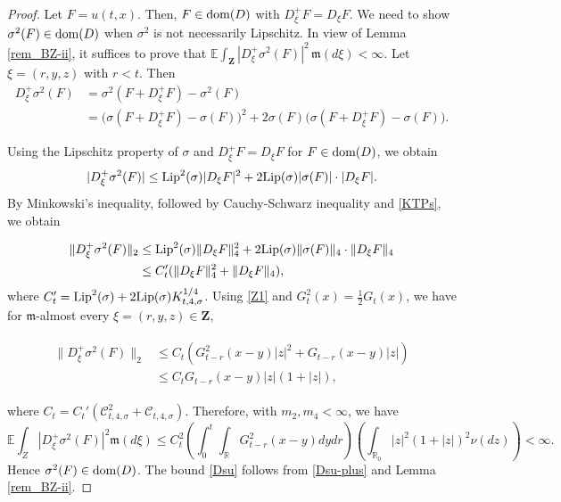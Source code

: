 \documentclass[letterpaper, 11pt,  reqno]{amsart}
\newcommand{\noi}{\noindent}
\newcommand{\R}{\mathbb{R}}
\newcommand{\E}{\mathbb{E}}
\newcommand{\s}{\sigma}
\newcommand{\fm}{\mathfrak{m}}
\newcommand{\dom}{\textup{dom}}
\numberwithin{equation}{section}
\numberwithin{theorem}{section}
\begin{document}
\begin{proof}
Let $F=u(t,x)$. Then, $F\in\dom(D)$ with $D^+_\xi F = D_\xi F$.
 We need to show $\s^2(F) \in  \dom(D)$ when $\s^2$ is not necessarily Lipschitz. 
In view of  Lemma \ref{rem_BZ-ii},  
it suffices to prove that $\E \int_{\mathbf{Z}} |D_{\xi}^{+}\s^2(F)|^2 \, \fm(d\xi)<\infty$.
Let $\xi=(r,y,z)$ with $r<t$. Then
\begin{align*}
D_{\xi}^{+}\s^2(F)
&=\s^2(F+D_{\xi}^{+}F)-\s^2(F) \\
&=\big(\s(F+D_{\xi}^{+}F)-\s(F)\big)^2 + 2\s(F) \big(\s(F+D_{\xi}^{+}F)-\s(F)\big).
\end{align*}

\noi
Using the Lipschitz property of $\s$  and $D_{\xi}^{+}F=D_{\xi}F$ for $F \in  \dom(D)$, 
we obtain
\[
|D_{\xi}^{+}\s^2(F)|\leq {\rm Lip}^2(\s)|D_{\xi}F|^2 + 2{\rm Lip}(\s)|\s(F)| \cdot  |D_{\xi}F|.
\]
By Minkowski's inequality, followed by Cauchy-Schwarz inequality 
and \eqref{KTPs}, 
we obtain

\noi
\begin{align*}
\|D_{\xi}^{+}\s^2(F)\|_2 
& \leq {\rm Lip}^2(\s)\|D_{\xi}F\|_4^2 
+ 2{\rm Lip}(\s)\|\s(F)\|_4 \cdot \|D_{\xi} F\|_4\\
& \leq C_t' (\|D_{\xi}F\|_4^2 +\|D_{\xi}F\|_4),
\end{align*}
where $C_t'= {\rm Lip}^2(\s)+2{\rm Lip}(\s)K_{t,4,\s}^{1/4}$.
Using \eqref{Z1} and $G_t^2(x)=\frac{1}{2}G_t(x)$, 
we have for $\fm$-almost every $\xi = (r, y, z)\in\mathbf{Z}$,

\noi
\begin{align} \label{Dsu-plus}
\begin{aligned}
\|D_{\xi}^{+}\s^2(F)\|_2 
&\leq C_t (G_{t-r}^2(x-y)|z|^2  +G_{t-r}(x-y)|z|) \\
& \leq C_t G_{t-r}(x-y)|z|(1+|z|),
\end{aligned}
\end{align}

\noi
where  $C_t=C_t' (\mathcal{C}_{t,4,\s}^2  +\mathcal{C}_{t,4,\s})$.
 Therefore, with $m_2, m_4<\infty$,
 we have 
\[
\E\int_{Z}|D_{\xi}^{+}\s^2(F)|^2 \fm(d\xi) \leq C_t^2 \left(\int_0^t \int_{\R} G_{t-r}^2(x-y)dydr\right)\left(\int_{\R_0} |z|^2 (1+|z|)^2 \nu(dz)\right)<\infty.
\]
Hence $\s^2(F) \in  \dom(D)$. 
The bound   \eqref{Dsu} follows from \eqref{Dsu-plus} and  Lemma \ref{rem_BZ-ii}.
\qedhere


\end{proof}
\end{document}
